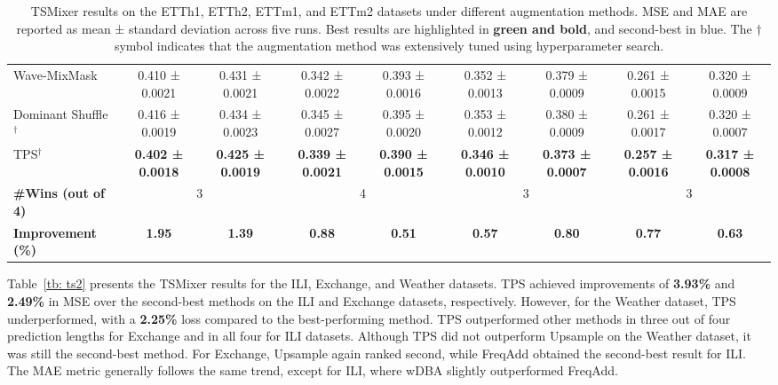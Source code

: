 \begin{table}[h!]
\begin{adjustbox}{max width=\textwidth}
\begin{tabular}{l|cc|cc|cc|cc}
    Wave-MixMask & \cellcolor{secondcolor}0.410 ± 0.0021 & \cellcolor{secondcolor}0.431 ± 0.0021 & \cellcolor{secondcolor}0.342 ± 0.0022 & 0.393 ± 0.0016 & 0.352 ± 0.0013 & 0.379 ± 0.0009 & 0.261 ± 0.0015 & 0.320 ± 0.0009  \\
    Dominant Shuffle$^{\dagger}$ & 0.416 ± 0.0019 & 0.434 ± 0.0023 & 0.345 ± 0.0027 & 0.395 ± 0.0020 & 0.353 ± 0.0012 & 0.380 ± 0.0009 & 0.261 ± 0.0017 & 0.320 ± 0.0007  \\
    TPS$^{\dagger}$ & \cellcolor{bestcolor}\textbf{0.402 ± 0.0018} & \cellcolor{bestcolor} \textbf{0.425 ± 0.0019} & \cellcolor{bestcolor}\textbf{0.339 ± 0.0021} & \cellcolor{bestcolor}\textbf{0.390 ± 0.0015} & \cellcolor{bestcolor}\textbf{0.346 ± 0.0010} & \cellcolor{bestcolor}\textbf{0.373 ± 0.0007} & \cellcolor{bestcolor}\textbf{0.257 ± 0.0016} & \cellcolor{bestcolor}\textbf{0.317 ± 0.0008}  \\
    \midrule
    \textbf{\#Wins (out of 4)} & \multicolumn{2}{c|}{3} & \multicolumn{2}{c|}{4} & \multicolumn{2}{c|}{3} & \multicolumn{2}{c}{3}  \\
    \textbf{Improvement (\%)} & \cellcolor{bestcolor} \textbf{1.95} & \cellcolor{bestcolor} \textbf{1.39} & \cellcolor{bestcolor} \textbf{0.88} & \cellcolor{bestcolor} \textbf{0.51} & \cellcolor{bestcolor} \textbf{0.57} & \cellcolor{bestcolor} \textbf{0.80} & \cellcolor{bestcolor} \textbf{0.77} & \cellcolor{bestcolor} \textbf{0.63}  \\
    \bottomrule
\end{tabular}
\end{adjustbox}
\caption{TSMixer results on the ETTh1, ETTh2, ETTm1, and ETTm2 datasets under different augmentation methods. MSE and MAE are reported as mean ± standard deviation across five runs. Best results are highlighted in \textbf{green and bold}, and second-best in blue. The $\dagger$ symbol indicates that the augmentation method was extensively tuned using hyperparameter search.}
\label{tb: ts1}
\end{table}

Table~\ref{tb: ts2} presents the TSMixer results for the ILI, Exchange, and Weather datasets. TPS achieved improvements of \textbf{3.93\%} and \textbf{2.49\%} in MSE over the second-best methods on the ILI and Exchange datasets, respectively. However, for the Weather dataset, TPS underperformed, with a \textbf{2.25\%} loss compared to the best-performing method. TPS outperformed other methods in three out of four prediction lengths for Exchange and in all four for ILI datasets. Although TPS did not outperform Upsample on the Weather dataset, it was still the second-best method. For Exchange, Upsample again ranked second, while FreqAdd obtained the second-best result for ILI. The MAE metric generally follows the same trend, except for ILI, where wDBA slightly outperformed FreqAdd.


